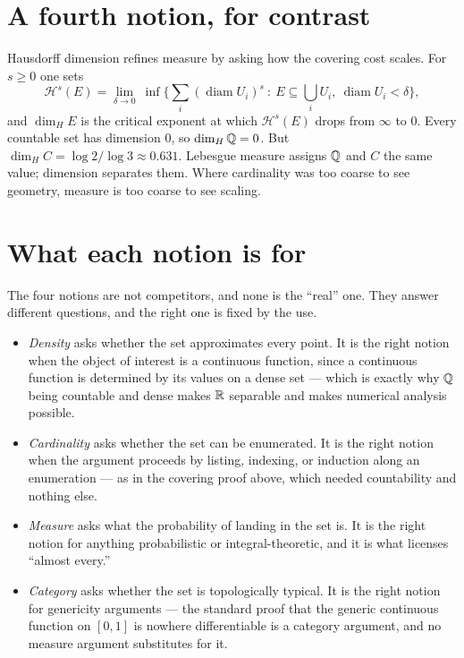 \documentclass{essay}
\DeclareMathOperator{\diam}{diam}
\begin{document}
\section{A fourth notion, for contrast}

Hausdorff dimension refines measure by asking how the covering cost
scales. For $s \geq 0$ one sets
\[
  \mathcal{H}^{s}(E) = \lim_{\delta \to 0}\ \inf\Big\{ \sum_i
  (\diam U_i)^{s} \ :\ E \subseteq \bigcup_i U_i,\ \diam U_i <
  \delta \Big\},
\]
and $\dim_H E$ is the critical exponent at which $\mathcal{H}^s(E)$
drops from $\infty$ to $0$. Every countable set has dimension $0$, so
$\dim_H \mathbb{Q} = 0$. But $\dim_H C = \log 2 / \log 3 \approx 0.631$.
Lebesgue measure assigns $\mathbb{Q}$ and $C$ the same value; dimension
separates them. Where cardinality was too coarse to see geometry,
measure is too coarse to see scaling.

\section{What each notion is for}

The four notions are not competitors, and none is the ``real'' one.
They answer different questions, and the right one is fixed by the use.

\begin{itemize}
\item \emph{Density} asks whether the set approximates every point. It
is the right notion when the object of interest is a continuous
function, since a continuous function is determined by its values on a
dense set --- which is exactly why $\mathbb{Q}$ being countable and dense makes
$\mathbb{R}$ separable and makes numerical analysis possible.

\item \emph{Cardinality} asks whether the set can be enumerated. It is
the right notion when the argument proceeds by listing, indexing, or
induction along an enumeration --- as in the covering proof above,
which needed countability and nothing else.

\item \emph{Measure} asks what the probability of landing in the set
is. It is the right notion for anything probabilistic or
integral-theoretic, and it is what licenses ``almost every.''

\item \emph{Category} asks whether the set is topologically typical. It
is the right notion for genericity arguments --- the standard proof
that the generic continuous function on $[0,1]$ is nowhere
differentiable is a category argument, and no measure argument
substitutes for it.
\end{itemize}
\end{document}
